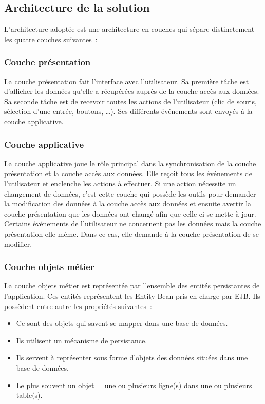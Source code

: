 \documentclass[a4paper, titlepage]{report}
\let\oldparagraph\subsubsection
\renewcommand{\subsubsection}[1]{\oldparagraph{#1}\mbox{}}
\begin{document}
\subsection{Architecture de la solution}\label{architecture-de-la-solution}

L'architecture adoptée est une architecture en couches qui sépare
distinctement les quatre couches suivantes~:

\subsubsection{Couche présentation}\label{couche-presentation}

La couche présentation fait l'interface avec l'utilisateur. Sa première
tâche est d'afficher les données qu'elle a récupérées auprès de la
couche accès aux données. Sa seconde tâche est de recevoir toutes les
actions de l'utilisateur (clic de souris, sélection d'une entrée,
boutons, \ldots{}). Ses différents événements sont envoyés à la couche
applicative.

\subsubsection{Couche applicative}\label{couche applicative}

La couche applicative joue le rôle principal dans la synchronisation de
la couche présentation et la couche accès aux données. Elle reçoit tous
les événements de l'utilisateur et enclenche les actions à effectuer. Si
une action nécessite un changement de données, c'est cette couche qui
possède les outils pour demander la modification des données à la couche
accès aux données et ensuite avertir la couche présentation que les
données ont changé afin que celle-ci se mette à jour. Certains
événements de l'utilisateur ne concernent pas les données mais la couche
présentation elle-même. Dans ce cas, elle demande à la couche
présentation de se modifier.

\subsubsection{Couche objets métier}\label{couche-objets-muxe9tier}

La couche objets métier est représentée par l'ensemble des entités
persistantes de l'application. Ces entités représentent les Entity Bean
pris en charge par EJB. Ils possèdent entre autre les propriétés
suivantes~:
\begin{itemize}
\item Ce sont des objets qui savent se mapper dans une base de
données.
\item Ils utilisent un mécanisme de persistance.
\item Ils servent à
représenter sous forme d'objets des données situées dans une base de
données.
\item Le plus souvent un objet = une ou plusieurs ligne(s) dans une
ou plusieurs table(s).
\end{itemize}
\end{document}
